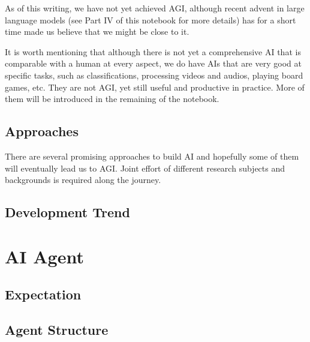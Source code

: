 As of this writing, we have not yet achieved AGI, although recent advent in large language models (see Part IV of this notebook for more details) has for a short time made us believe that we might be close to it.

It is worth mentioning that although there is not yet a comprehensive AI that is comparable with a human at every aspect, we do have AIs that are very good at specific tasks, such as classifications, processing videos and audios, playing board games, etc. They are not AGI, yet still useful and productive in practice. More of them will be introduced in the remaining of the notebook.

\subsection{Approaches}

There are several promising approaches to build AI and hopefully some of them will eventually lead us to AGI. Joint effort of different research subjects and backgrounds is required along the journey.

\subsection{Development Trend}

\section{AI Agent}

\subsection{Expectation}

\subsection{Agent Structure}